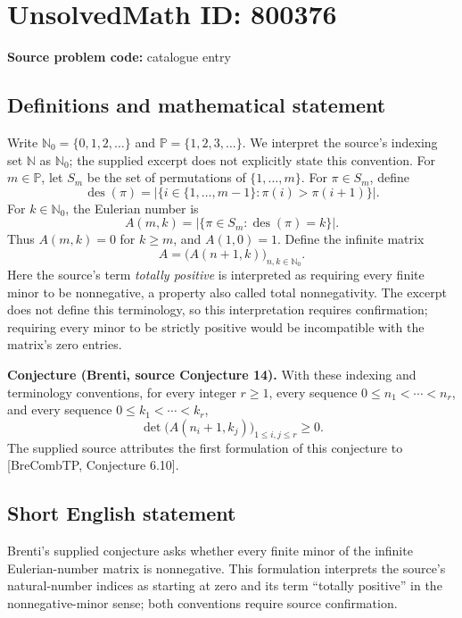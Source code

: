 \documentclass[11pt]{article}
\begin{document}
\section*{UnsolvedMath ID: 800376}
\textbf{Source problem code:} catalogue entry
\subsection{Definitions and mathematical statement}
Write \(\mathbb{N}_0=\{0,1,2,\ldots\}\) and \(\mathbb{P}=\{1,2,3,\ldots\}\). We interpret the source's indexing set \(\mathbb{N}\) as \(\mathbb{N}_0\); the supplied excerpt does not explicitly state this convention. For \(m\in\mathbb{P}\), let \(S_m\) be the set of permutations of \(\{1,\ldots,m\}\). For \(\pi\in S_m\), define
\[
\operatorname{des}(\pi)=\left|\{i\in\{1,\ldots,m-1\}:\pi(i)>\pi(i+1)\}\right|.
\]
For \(k\in\mathbb{N}_0\), the Eulerian number is
\[
A(m,k)=\left|\{\pi\in S_m:\operatorname{des}(\pi)=k\}\right|.
\]
Thus \(A(m,k)=0\) for \(k\ge m\), and \(A(1,0)=1\). Define the infinite matrix
\[
A=\bigl(A(n+1,k)\bigr)_{n,k\in\mathbb{N}_0}.
\]
Here the source's term \emph{totally positive} is interpreted as requiring every finite minor to be nonnegative, a property also called total nonnegativity. The excerpt does not define this terminology, so this interpretation requires confirmation; requiring every minor to be strictly positive would be incompatible with the matrix's zero entries.

\textbf{Conjecture (Brenti, source Conjecture 14).} With these indexing and terminology conventions, for every integer \(r\ge1\), every sequence \(0\le n_1<\cdots<n_r\), and every sequence \(0\le k_1<\cdots<k_r\),
\[
\det\!\bigl(A(n_i+1,k_j)\bigr)_{1\le i,j\le r}\ge0.
\]
The supplied source attributes the first formulation of this conjecture to [BreCombTP, Conjecture 6.10].
\subsection{Short English statement}
Brenti's supplied conjecture asks whether every finite minor of the infinite Eulerian-number matrix is nonnegative. This formulation interprets the source's natural-number indices as starting at zero and its term ``totally positive'' in the nonnegative-minor sense; both conventions require source confirmation.
\end{document}
